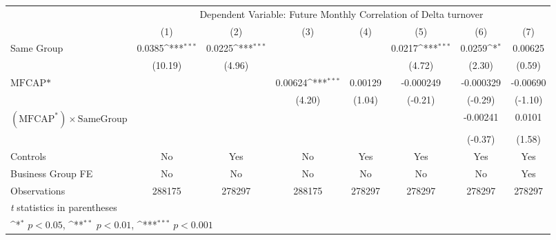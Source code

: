 {
\def\sym#1{\ifmmode^{#1}\else\(^{#1}\)\fi}
\begin{tabular}{l*{7}{c}}
\hline\hline
                &\multicolumn{7}{c}{Dependent Variable:  Future Monthly Correlation of Delta turnover}                                               \\\cmidrule(lr){2-8}
                &\multicolumn{1}{c}{(1)}         &\multicolumn{1}{c}{(2)}         &\multicolumn{1}{c}{(3)}         &\multicolumn{1}{c}{(4)}         &\multicolumn{1}{c}{(5)}         &\multicolumn{1}{c}{(6)}         &\multicolumn{1}{c}{(7)}         \\
\hline
Same Group      &   0.0385\sym{***}&   0.0225\sym{***}&                  &                  &   0.0217\sym{***}&   0.0259\sym{*}  &  0.00625         \\
                &  (10.19)         &   (4.96)         &                  &                  &   (4.72)         &   (2.30)         &   (0.59)         \\
[1em]
$ \text{MFCAP*} $&                  &                  &  0.00624\sym{***}&  0.00129         &-0.000249         &-0.000329         & -0.00690         \\
                &                  &                  &   (4.20)         &   (1.04)         &  (-0.21)         &  (-0.29)         &  (-1.10)         \\
[1em]
 $ (\text{MFCAP}^*) \times {\text{SameGroup} }  $ &                  &                  &                  &                  &                  & -0.00241         &   0.0101         \\
                &                  &                  &                  &                  &                  &  (-0.37)         &   (1.58)         \\
\hline
Controls        &       No         &      Yes         &       No         &      Yes         &      Yes         &      Yes         &      Yes         \\
Business Group FE&       No         &       No         &       No         &       No         &       No         &       No         &      Yes         \\
Observations    &   288175         &   278297         &   288175         &   278297         &   278297         &   278297         &   278297         \\
\hline\hline
\multicolumn{8}{l}{\footnotesize \textit{t} statistics in parentheses}\\
\multicolumn{8}{l}{\footnotesize \sym{*} \(p<0.05\), \sym{**} \(p<0.01\), \sym{***} \(p<0.001\)}\\
\end{tabular}
}
